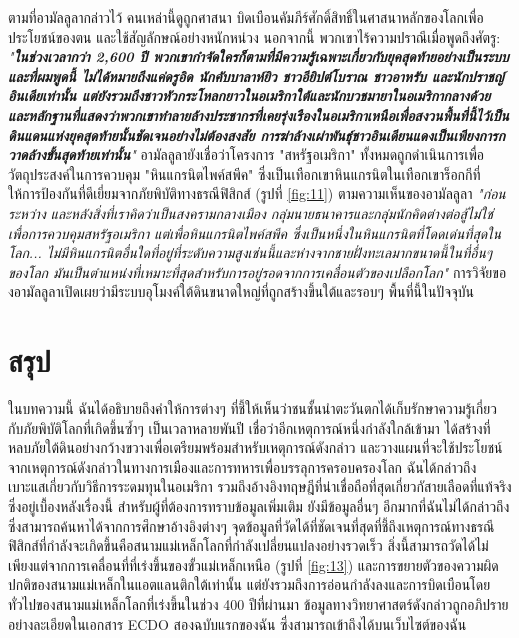 \documentclass[10pt,twocolumn,letterpaper]{article}
\begin{document}
ตามที่อามัลลูลากล่าวไว้ คนเหล่านี้ดูถูกศาสนา บิดเบือนคัมภีร์ศักดิ์สิทธิ์ในศาสนาหลักของโลกเพื่อประโยชน์ของตน และใช้สัญลักษณ์อย่างหนักหน่วง นอกจากนี้ พวกเขาไร้ความปราณีเมื่อพูดถึงศัตรู: \textit{"\textbf{ในช่วงเวลากว่า 2,600 ปี พวกเขากำจัดใครก็ตามที่มีความรู้เฉพาะเกี่ยวกับยุคสุดท้ายอย่างเป็นระบบ และที่ผมพูดนี้ ไม่ได้หมายถึงแค่ดรูอิด นักคับบาลาห์ยิว ชาวอียิปต์โบราณ ชาวอาหรับ และนักปราชญ์อินเดียเท่านั้น แต่ยังรวมถึงชาวหัวกระโหลกยาวในอเมริกาใต้และนักบวชมายาในอเมริกากลางด้วย และหลักฐานที่แสดงว่าพวกเขาทำลายล้างประชากรที่เคยรุ่งเรืองในอเมริกาเหนือเพื่อสงวนพื้นที่นี้ไว้เป็นดินแดนแห่งยุคสุดท้ายนั้นชัดเจนอย่างไม่ต้องสงสัย การฆ่าล้างเผ่าพันธุ์ชาวอินเดียนแดงเป็นเพียงการกวาดล้างขั้นสุดท้ายเท่านั้น}"} \cite{33,34}
อามัลลูลายังเชื่อว่าโครงการ "สหรัฐอเมริกา" ทั้งหมดถูกดำเนินการเพื่อวัตถุประสงค์ในการควบคุม "หินแกรนิตไพค์สพีค" ซึ่งเป็นเทือกเขาหินแกรนิตในเทือกเขาร็อกกีที่ให้การป้องกันที่ดีเยี่ยมจากภัยพิบัติทางธรณีฟิสิกส์ (รูปที่ \ref{fig:11}) ตามความเห็นของอามัลลูลา \textit{"ก่อน ระหว่าง และหลังสิ่งที่เราคิดว่าเป็นสงครามกลางเมือง กลุ่มนายธนาคารและกลุ่มนักคิดต่างต่อสู้ไม่ใช่เพื่อการควบคุมสหรัฐอเมริกา แต่เพื่อหินแกรนิตไพค์สพีค ซึ่งเป็นหนึ่งในหินแกรนิตที่โดดเด่นที่สุดในโลก... ไม่มีหินแกรนิตอื่นใดที่อยู่ที่ระดับความสูงเช่นนี้และห่างจากชายฝั่งทะเลมากขนาดนี้ในที่อื่นๆ ของโลก มันเป็นตำแหน่งที่เหมาะที่สุดสำหรับการอยู่รอดจากการเคลื่อนตัวของเปลือกโลก"} \cite{33,34} การวิจัยของอามัลลูลาเปิดเผยว่ามีระบบอุโมงค์ใต้ดินขนาดใหญ่ที่ถูกสร้างขึ้นใต้และรอบๆ พื้นที่นี้ในปัจจุบัน \cite{36}

\section{สรุป}

ในบทความนี้ ฉันได้อธิบายถึงคำให้การต่างๆ ที่ชี้ให้เห็นว่าชนชั้นนำตะวันตกได้เก็บรักษาความรู้เกี่ยวกับภัยพิบัติโลกที่เกิดขึ้นซ้ำๆ เป็นเวลาหลายพันปี เชื่อว่าอีกเหตุการณ์หนึ่งกำลังใกล้เข้ามา ได้สร้างที่หลบภัยใต้ดินอย่างกว้างขวางเพื่อเตรียมพร้อมสำหรับเหตุการณ์ดังกล่าว และวางแผนที่จะใช้ประโยชน์จากเหตุการณ์ดังกล่าวในทางการเมืองและการทหารเพื่อบรรลุการครอบครองโลก ฉันได้กล่าวถึงเบาะแสเกี่ยวกับวิธีการระดมทุนในอเมริกา รวมถึงอ้างอิงทฤษฎีที่น่าเชื่อถือที่สุดเกี่ยวกัสายเลือดที่แท้จริงซึ่งอยู่เบื้องหลังเรื่องนี้ สำหรับผู้ที่ต้องการทราบข้อมูลเพิ่มเติม ยังมีข้อมูลอื่นๆ อีกมากที่ฉันไม่ได้กล่าวถึงซึ่งสามารถค้นหาได้จากการศึกษาอ้างอิงต่างๆ
จุดข้อมูลที่วัดได้ที่ชัดเจนที่สุดที่ชี้ถึงเหตุการณ์ทางธรณีฟิสิกส์ที่กำลังจะเกิดขึ้นคือสนามแม่เหล็กโลกที่กำลังเปลี่ยนแปลงอย่างรวดเร็ว สิ่งนี้สามารถวัดได้ไม่เพียงแต่จากการเคลื่อนที่ที่เร่งขึ้นของขั้วแม่เหล็กเหนือ (รูปที่ \ref{fig:13}) และการขยายตัวของความผิดปกติของสนามแม่เหล็กในแอตแลนติกใต้เท่านั้น แต่ยังรวมถึงการอ่อนกำลังลงและการบิดเบือนโดยทั่วไปของสนามแม่เหล็กโลกที่เร่งขึ้นในช่วง 400 ปีที่ผ่านมา \cite{3} ข้อมูลทางวิทยาศาสตร์ดังกล่าวถูกอภิปรายอย่างละเอียดในเอกสาร ECDO สองฉบับแรกของฉัน ซึ่งสามารถเข้าถึงได้บนเว็บไซต์ของฉัน \cite{3}
\end{document}
